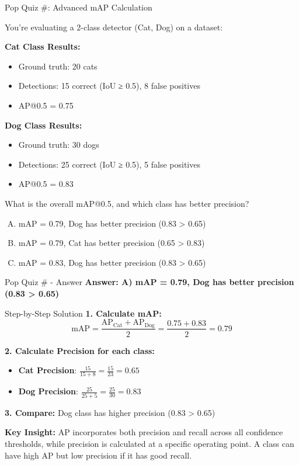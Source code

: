 \documentclass[usenames,dvipsnames]{beamer}
\begin{document}
	\begin{frame}{Pop Quiz \#\thepopquiz: Advanced mAP Calculation}
		\begin{popquizbox}{\thepopquiz}
		You're evaluating a 2-class detector (Cat, Dog) on a dataset:
		
		\textbf{Cat Class Results:}
		\begin{itemize}
			\item Ground truth: 20 cats
			\item Detections: 15 correct (IoU ≥ 0.5), 8 false positives
			\item AP@0.5 = 0.75
		\end{itemize}
		
		\textbf{Dog Class Results:}
		\begin{itemize}
			\item Ground truth: 30 dogs  
			\item Detections: 25 correct (IoU ≥ 0.5), 5 false positives
			\item AP@0.5 = 0.83
		\end{itemize}
		
		What is the overall mAP@0.5, and which class has better precision?
		
		\begin{enumerate}[A)]
			\item mAP = 0.79, Dog has better precision (0.83 > 0.65)
			\item mAP = 0.79, Cat has better precision (0.65 > 0.83) 
			\item mAP = 0.83, Dog has better precision (0.83 > 0.65)
		\end{enumerate}
		\end{popquizbox}
	\end{frame}
	
	\begin{frame}{Pop Quiz \#\thepopquiz{} - Answer}
		\textbf{Answer: A) mAP = 0.79, Dog has better precision (0.83 > 0.65)}
		
		\begin{examplebox}{Step-by-Step Solution}
		\textbf{1. Calculate mAP:}
		$$\text{mAP} = \frac{\text{AP}_{\text{Cat}} + \text{AP}_{\text{Dog}}}{2} = \frac{0.75 + 0.83}{2} = 0.79$$
		
		\textbf{2. Calculate Precision for each class:}
		\begin{itemize}
			\item \textbf{Cat Precision}: $\frac{15}{15+8} = \frac{15}{23} = 0.65$
			\item \textbf{Dog Precision}: $\frac{25}{25+5} = \frac{25}{30} = 0.83$  
		\end{itemize}
		
		\textbf{3. Compare:} Dog class has higher precision (0.83 > 0.65)
		\end{examplebox}
		
		\begin{keypointsbox}
		\textbf{Key Insight:} AP incorporates both precision and recall across all confidence thresholds, while precision is calculated at a specific operating point. A class can have high AP but low precision if it has good recall.
		\end{keypointsbox}
	\end{frame}
	
\end{document}
